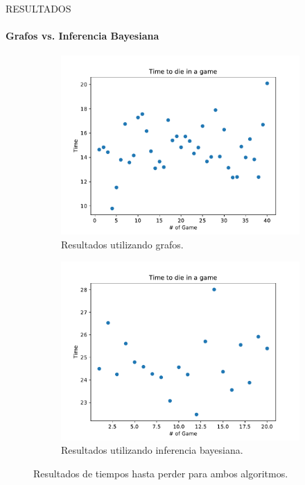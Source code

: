 \begin{frame}{RESULTADOS}
    \framesubtitle{Grafos vs. Inferencia Bayesiana}
    \begin{figure}[H]
  \centering
  \begin{subfigure}[H]{0.4\textwidth}
    \includegraphics[scale = 0.33]{files/3.pdf}
    \centering
    \caption{Resultados utilizando grafos.}
  \end{subfigure}
  \hspace{1cm}
  \begin{subfigure}[H]{0.4\textwidth}
    \includegraphics[scale = 0.33]{files/4.pdf}
    \centering
    \caption{Resultados utilizando inferencia bayesiana.}
  \end{subfigure}
  \caption{Resultados de tiempos hasta perder para ambos algoritmos.}
  \label{img:timeresults}
\end{figure}
\end{frame}
